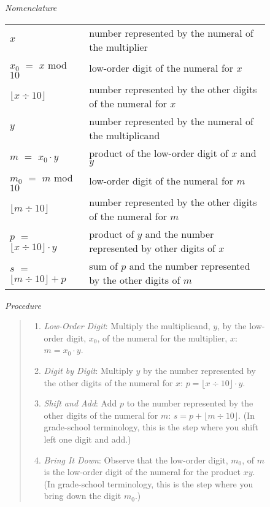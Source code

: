 \begin{figure}
\emph{Nomenclature}
\begin{center}
\begin{tabular}{ll}
$x$                       &number represented by the numeral of the multiplier\\
$x_0$ $=$ $x$ mod $10$    &low-order digit of the numeral for $x$\\
$\lfloor x\div 10\rfloor$ &number represented by the other digits of the numeral for $x$\\
$y$                       &number represented by the numeral of the multiplicand\\
$m$   $=$ $x_0\cdot y$    &product of the low-order digit of $x$ and $y$\\
$m_0$ $=$ $m$ mod $10$    &low-order digit of the numeral for $m$\\
$\lfloor m\div 10\rfloor$ &number represented by the other digits of the numeral for $m$\\
$p$   $=$ $\lfloor x\div 10\rfloor\cdot y$ &product of $y$ and the number represented by other digits of $x$\\
$s$   $=$ $\lfloor m\div 10\rfloor + p$    &sum of $p$ and the number represented by the other digits of $m$\\
\end{tabular}
\end{center}

\emph{Procedure}
\begin{quote}
\begin{enumerate}
\item \emph{Low-Order Digit}:
Multiply the multiplicand, $y$, by the low-order digit, $x_0$,
of the numeral for the multiplier, $x$: $m = x_0\cdot y$.

\item \emph{Digit by Digit}:
Multiply $y$ by the number
represented by the other digits of the numeral for $x$: 
$p=\lfloor x\div 10\rfloor\cdot y$.

\item \emph{Shift and Add}:
Add $p$ to the number represented by 
the other digits of the numeral for $m$: $s = p + \lfloor m\div 10\rfloor$.
(In grade-school terminology, this is the step where you
shift left one digit and add.)

\item \emph{Bring It Down}:
Observe that the low-order digit, $m_0$, of $m$
is the low-order digit of the numeral for the product $x y$.
(In grade-school terminology,
this is the step where you bring down the digit $m_0$.)


\end{enumerate}
\end{quote}
\end{figure}
